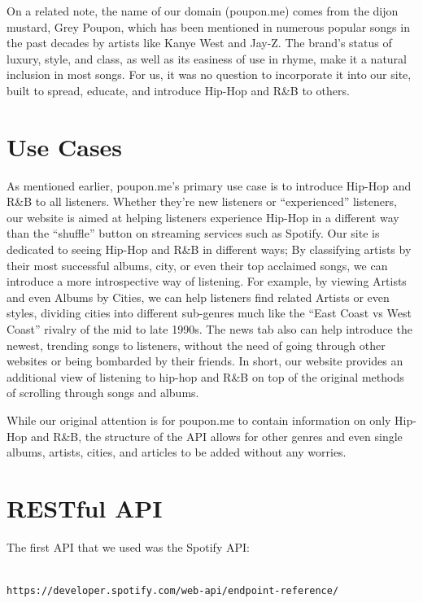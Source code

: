 \documentclass{scrartcl}
\begin{document}
    On a related note, the name of our domain (poupon.me) comes from the dijon mustard, Grey Poupon, which has been mentioned in numerous popular songs in the past decades by artists like Kanye West and Jay-Z. The brand’s status of luxury, style, and class, as well as its easiness of use in rhyme, make it a natural inclusion in most songs. For us, it was no question to incorporate it into our site, built to spread, educate, and introduce Hip-Hop and R\&B to others.

    \section{Use Cases}
    \indent As mentioned earlier, poupon.me’s primary use case is to introduce Hip-Hop and R\&B to all listeners. Whether they’re new listeners or “experienced” listeners, our website is aimed at helping listeners experience Hip-Hop in a different way than the “shuffle” button on streaming services such as Spotify. Our site is dedicated to seeing Hip-Hop and R\&B in different ways; By classifying artists by their most successful albums, city, or even their top acclaimed songs, we can introduce a more introspective way of listening. For example, by viewing Artists and even Albums by Cities, we can help listeners find related Artists or even styles, dividing cities into different sub-genres much like the “East Coast vs West Coast” rivalry of the mid to late 1990s. The news tab also can help introduce the newest, trending songs to listeners, without the need of going through other websites or being bombarded by their friends. In short, our website provides an additional view of listening to hip-hop and R\&B on top of the original methods of scrolling through songs and albums.

    While our original attention is for poupon.me to contain information on only Hip-Hop and R\&B, the structure of the API allows for other genres and even single albums, artists, cities, and articles to be added without any worries.

    \section{RESTful API}
    The first API that we used was the Spotify API: \begin{verbatim}
                                                        https://developer.spotify.com/web-api/endpoint-reference/
    \end{verbatim}
\end{document}
